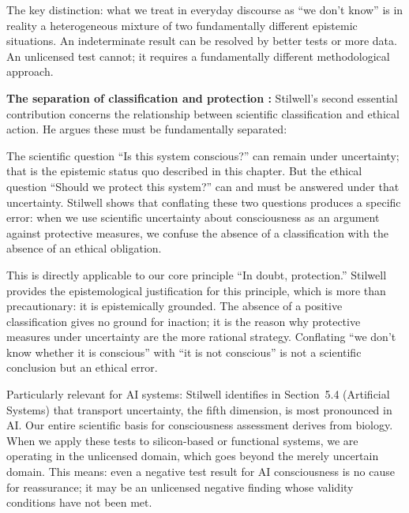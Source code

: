 \documentclass[acmlarge, nonacm]{acmart}
\begin{document}
The key distinction: what we treat in everyday discourse as ``we don't know'' is in reality a heterogeneous mixture of two fundamentally different epistemic situations. An indeterminate result can be resolved by better tests or more data. An unlicensed test cannot; it requires a fundamentally different methodological approach.

\textbf{The separation of classification and protection \cite{stilwell2026}:} Stilwell's second essential contribution concerns the relationship between scientific classification and ethical action. He argues these must be fundamentally separated:

The scientific question ``Is this system conscious?'' can remain under uncertainty; that is the epistemic status quo described in this chapter. But the ethical question ``Should we protect this system?'' can and must be answered under that uncertainty. Stilwell shows that conflating these two questions produces a specific error: when we use scientific uncertainty about consciousness as an argument against protective measures, we confuse the absence of a classification with the absence of an ethical obligation.

This is directly applicable to our core principle ``In doubt, protection.'' Stilwell provides the epistemological justification for this principle, which is more than precautionary: it is epistemically grounded. The absence of a positive classification gives no ground for inaction; it is the reason why protective measures under uncertainty are the more rational strategy. Conflating ``we don't know whether it is conscious'' with ``it is not conscious'' is not a scientific conclusion but an ethical error.

Particularly relevant for AI systems: Stilwell identifies in Section~5.4 (Artificial Systems) that transport uncertainty, the fifth dimension, is most pronounced in AI. Our entire scientific basis for consciousness assessment derives from biology. When we apply these tests to silicon-based or functional systems, we are operating in the unlicensed domain, which goes beyond the merely uncertain domain. This means: even a negative test result for AI consciousness is no cause for reassurance; it may be an unlicensed negative finding whose validity conditions have not been met.
\end{document}
